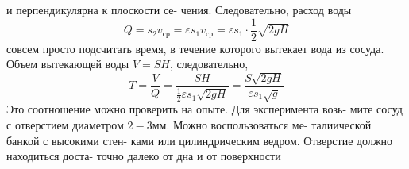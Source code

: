 \begin{minipage}[t]{0.44\textwidth}
    и перпендикулярна к плоскости се-\linebreak
    чения. Следовательно, расход воды\linebreak
    $$Q=s_2v_{ср}=\varepsilon s_1v_{ср}=\varepsilon s_1 \cdot \frac{1}{2}\sqrt{2gH}$$
    \null{} совсем просто подсчитать\linebreak
    время, в течение которого вытекает\linebreak
    вода из сосуда. Объем вытекающей\linebreak
    воды $V=SH$, следовательно,
    $$T=\frac{V}{Q}=\frac{SH}{\frac{1}{2}\varepsilon s_1\sqrt{2gH}}=\frac{S\sqrt{2gH}}{\varepsilon s_1\sqrt{g}}$$
    Это соотношение можно проверить\linebreak
    на опыте. Для эксперимента возь-\linebreak
    мите сосуд с отверстием диаметром\linebreak
    $2-3 мм$. Можно воспользоваться ме-\linebreak
    талиической банкой с высокими стен-\linebreak
    ками или цилиндрическим ведром.\linebreak
    Отверстие должно находиться доста-\linebreak
    точно далеко от дна и от поверхности\linebreak
\end{minipage}
\lfoot{\textbf{}}